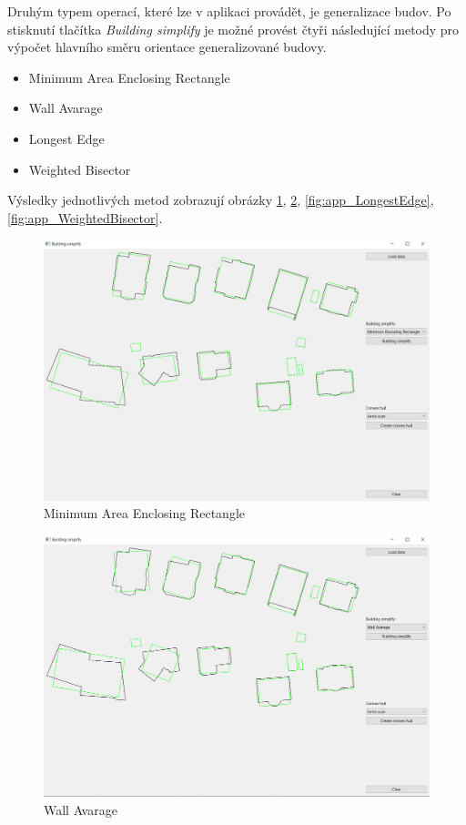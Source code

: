 \documentclass[11pt]{article}
\begin{document}
	Druhým typem operací, které lze v aplikaci provádět, je generalizace budov. Po stisknutí tlačítka \textit{Building simplify} je možné provést čtyři následující metody pro výpočet hlavního směru orientace generalizované budovy.
	
	\begin{itemize}
		\item Minimum Area Enclosing Rectangle 
		\item Wall Avarage 
		\item Longest Edge
		\item Weighted Bisector 
	\end{itemize}
	
	Výsledky jednotlivých metod zobrazují obrázky \ref{fig:app_MAER}, \ref{fig:app_WallAvarage}, \ref{fig:app_LongestEdge}, \ref{fig:app_WeightedBisector}.
	\begin{figure}[htbh]
		\centering
		\includegraphics[scale=0.4]{images/U2_aplikace_MAER.png} 
		\caption{Minimum Area Enclosing Rectangle}
		\label{fig:app_MAER}
	\end{figure} 
	\begin{figure}[htbh]
		\centering
		\includegraphics[scale=0.4]{images/U2_aplikace_WallAvarage.png} 
		\caption{Wall Avarage}
		\label{fig:app_WallAvarage}
	\end{figure} 
\end{document}
